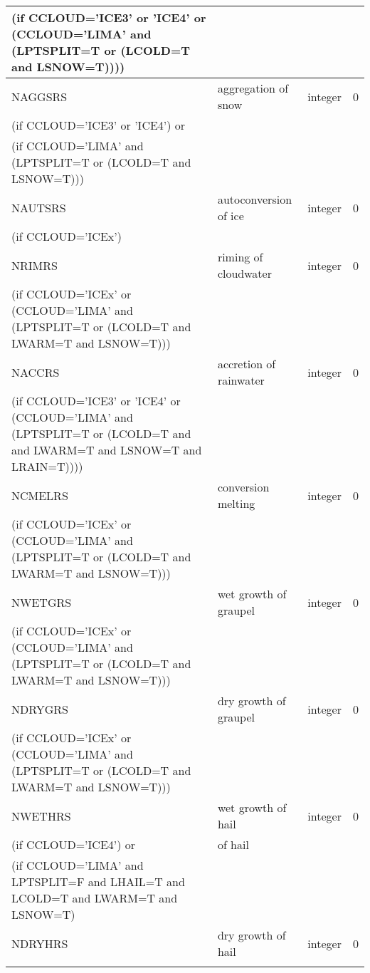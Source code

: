 \begin{longtable} {|p{}|p{}|>{\centering}p{}|p{}<{\centering}|}
(if CCLOUD='ICE3' or 'ICE4' or (CCLOUD='LIMA' and (LPTSPLIT=T or (LCOLD=T and LSNOW=T)))) & &   &  \\\hline
NAGGSRS  & aggregation of snow    & integer  &  0 \index{NAGGSRS!\innam{NAM\_BU\_RRS}}\\ \nopagebreak
(if CCLOUD='ICE3' or 'ICE4') or & &   &  \\ \nopagebreak
(if CCLOUD='LIMA' and (LPTSPLIT=T or (LCOLD=T and LSNOW=T))) & &   &  \\\hline
NAUTSRS  & autoconversion of ice   & integer  &  0 \index{NAUTSRS!\innam{NAM\_BU\_RRS}}\\ \nopagebreak
(if CCLOUD='ICEx') & &   &  \\\hline
NRIMRS   & riming of cloudwater    & integer  &  0 \index{NRIMRS!\innam{NAM\_BU\_RRS}}\\ \nopagebreak
(if CCLOUD='ICEx' or (CCLOUD='LIMA' and (LPTSPLIT=T or (LCOLD=T and LWARM=T and LSNOW=T))) & & & \\\hline
NACCRS   & accretion of rainwater  & integer  &  0 \index{NACCRS!\innam{NAM\_BU\_RRS}}\\ \nopagebreak
(if CCLOUD='ICE3' or 'ICE4' or (CCLOUD='LIMA' and (LPTSPLIT=T or (LCOLD=T and and LWARM=T and LSNOW=T and LRAIN=T)))) & &   &  \\\hline
NCMELRS  & conversion melting     & integer  &  0 \index{NCMELRS!\innam{NAM\_BU\_RRS}}\\ \nopagebreak
(if CCLOUD='ICEx' or (CCLOUD='LIMA' and (LPTSPLIT=T or (LCOLD=T and LWARM=T and LSNOW=T))) & & & \\\hline
NWETGRS  & wet growth of graupel   & integer  &  0 \index{NWETGRS!\innam{NAM\_BU\_RRS}}\\ \nopagebreak
(if CCLOUD='ICEx' or (CCLOUD='LIMA' and (LPTSPLIT=T or (LCOLD=T and LWARM=T and LSNOW=T))) & & & \\\hline
NDRYGRS  & dry growth of graupel   & integer  &  0 \index{NDRYGRS!\innam{NAM\_BU\_RRS}}\\ \nopagebreak
(if CCLOUD='ICEx' or (CCLOUD='LIMA' and (LPTSPLIT=T or (LCOLD=T and LWARM=T and LSNOW=T))) & & & \\\hline
NWETHRS  & wet growth of hail  & integer  &  0 \index{NWETHRS!\innam{NAM\_BU\_RRS}}\\ \nopagebreak
(if CCLOUD='ICE4') or &of hail &   &  \\
(if CCLOUD='LIMA' and LPTSPLIT=F and LHAIL=T and LCOLD=T and LWARM=T and LSNOW=T) & &   &  \\\hline
NDRYHRS&    dry growth of hail& integer  &  0 \index{NDRYHRS!\innam{NAM\_BU\_RRS}}\\ \nopagebreak

\end{longtable}
